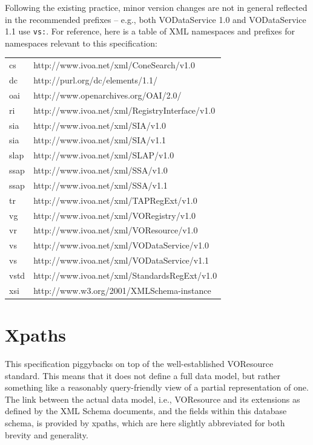 \documentclass[11pt,a4paper]{ivoa}
\begin{document}
Following the existing practice, minor version changes are not in
general reflected in the recommended prefixes -- e.g., both VODataService
1.0 and VODataService 1.1 use \texttt{vs:}.  For reference, here is
a table of XML namespaces and prefixes for namespaces relevant to this
specification:


\begin{inlinetable}
\begin{tabular}{ll}
cs&http://www.ivoa.net/xml/ConeSearch/v1.0\\
dc&http://purl.org/dc/elements/1.1/\\
oai&http://www.openarchives.org/OAI/2.0/\\
ri&http://www.ivoa.net/xml/RegistryInterface/v1.0\\
sia&http://www.ivoa.net/xml/SIA/v1.0\\
sia&http://www.ivoa.net/xml/SIA/v1.1\\
slap&http://www.ivoa.net/xml/SLAP/v1.0\\
ssap&http://www.ivoa.net/xml/SSA/v1.0\\
ssap&http://www.ivoa.net/xml/SSA/v1.1\\
tr&http://www.ivoa.net/xml/TAPRegExt/v1.0\\
vg&http://www.ivoa.net/xml/VORegistry/v1.0\\
vr&http://www.ivoa.net/xml/VOResource/v1.0\\
vs&http://www.ivoa.net/xml/VODataService/v1.0\\
vs&http://www.ivoa.net/xml/VODataService/v1.1\\
vstd&http://www.ivoa.net/xml/StandardsRegExt/v1.0\\
xsi&http://www.w3.org/2001/XMLSchema-instance\\

\end{tabular}
\end{inlinetable}


\section{Xpaths}

\label{vorutypes}

This specification piggybacks on top of the well-established
VOResource standard.  This means that it does not define a full data model,
but rather something like a reasonably query-friendly view of a partial
representation of one.  The link between the actual data model, i.e.,
VOResource and its extensions as defined by the XML Schema documents, and
the fields within this database schema, is provided by
xpaths, which are here slightly abbreviated for both brevity and
generality.
\end{document}
